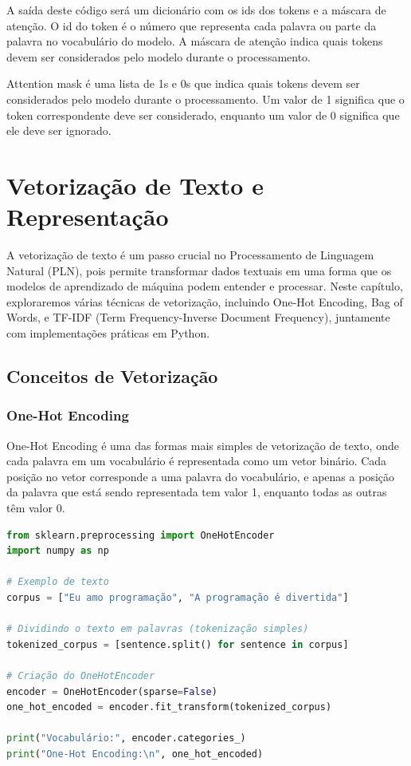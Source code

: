 \documentclass[14pt,a4paper,oneside]{book}
\begin{document}
A saída deste código será um dicionário com os ids dos tokens e a máscara de atenção. O id do token é o número que representa cada palavra ou parte da palavra no vocabulário do modelo. A máscara de atenção indica quais tokens devem ser considerados pelo modelo durante o processamento.

Attention mask é uma lista de 1s e 0s que indica quais tokens devem ser considerados pelo modelo durante o processamento. Um valor de 1 significa que o token correspondente deve ser considerado, enquanto um valor de 0 significa que ele deve ser ignorado.



	
\chapter{Vetorização de Texto e Representação}

A vetorização de texto é um passo crucial no Processamento de Linguagem Natural (PLN), pois permite transformar dados textuais em uma forma que os modelos de aprendizado de máquina podem entender e processar. Neste capítulo, exploraremos várias técnicas de vetorização, incluindo One-Hot Encoding, Bag of Words, e TF-IDF (Term Frequency-Inverse Document Frequency), juntamente com implementações práticas em Python.

\section{Conceitos de Vetorização}

\subsection{One-Hot Encoding}
One-Hot Encoding é uma das formas mais simples de vetorização de texto, onde cada palavra em um vocabulário é representada como um vetor binário. Cada posição no vetor corresponde a uma palavra do vocabulário, e apenas a posição da palavra que está sendo representada tem valor 1, enquanto todas as outras têm valor 0.

\begin{lstlisting}[language=Python]
from sklearn.preprocessing import OneHotEncoder
import numpy as np

# Exemplo de texto
corpus = ["Eu amo programação", "A programação é divertida"]

# Dividindo o texto em palavras (tokenização simples)
tokenized_corpus = [sentence.split() for sentence in corpus]

# Criação do OneHotEncoder
encoder = OneHotEncoder(sparse=False)
one_hot_encoded = encoder.fit_transform(tokenized_corpus)

print("Vocabulário:", encoder.categories_)
print("One-Hot Encoding:\n", one_hot_encoded)
\end{lstlisting}
\end{document}

